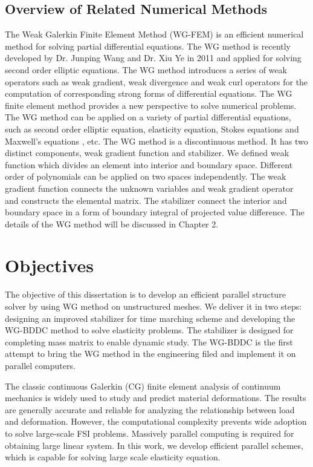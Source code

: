 \subsection{Overview of Related Numerical Methods}

The Weak Galerkin Finite Element Method (WG-FEM) is an efficient numerical method for solving partial differential equations. The WG method is recently developed by Dr. Junping Wang and Dr. Xiu Ye in 2011 and applied for solving second order elliptic equations\cite{wang2014weak}. The WG method introduces a series of weak operators such as weak gradient, weak divergence and weak curl operators for the computation of corresponding strong forms of differential equations. The WG finite element method provides a  new perspective to solve numerical problems. The WG method can be applied on a variety of partial differential equations, such as second order elliptic equation, elasticity equation\cite{wang2016locking}, Stokes equations \cite{wang2016weak} and Maxwell's equations \cite{mu2013weak}, etc. The WG method is a discontinuous method. It has two distinct components, weak gradient function and stabilizer. We defined weak function which divides an element into interior and boundary space. Different order of polynomials can be applied on two spaces independently. The weak gradient function connects the unknown variables and weak gradient operator and constructs the elemental matrix. The stabilizer connect the interior and boundary space in a form of boundary integral of projected value difference. The details of the WG method will be discussed in Chapter 2.

\section{Objectives}

The objective of this dissertation is to develop an efficient parallel structure solver by using WG method on unstructured meshes. We deliver it in two steps: designing an improved stabilizer for time marching scheme and developing the WG-BDDC method to solve elasticity problems. The stabilizer is designed for completing mass matrix to enable dynamic study. The WG-BDDC is the first attempt to bring the WG method in the engineering filed and implement it on parallel computers. 

The classic continuous Galerkin (CG) finite element analysis of continuum mechanics is widely used to study and predict material deformations. The results are generally accurate and reliable for analyzing the relationship between load and deformation. However, the computational complexity prevents wide adoption to solve large-scale FSI problems. Massively parallel computing is required for obtaining large linear system. In this work, we develop efficient parallel schemes, which is capable for solving large scale elasticity equation.

